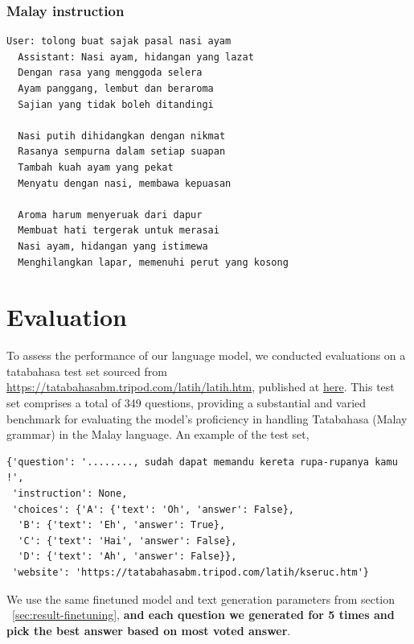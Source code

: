 \documentclass{article}
\begin{document}
\subsubsection{Malay instruction}

\begin{lstlisting}[breaklines=true]
  User: tolong buat sajak pasal nasi ayam
  Assistant: Nasi ayam, hidangan yang lazat
  Dengan rasa yang menggoda selera
  Ayam panggang, lembut dan beraroma
  Sajian yang tidak boleh ditandingi
  
  Nasi putih dihidangkan dengan nikmat
  Rasanya sempurna dalam setiap suapan
  Tambah kuah ayam yang pekat
  Menyatu dengan nasi, membawa kepuasan
  
  Aroma harum menyeruak dari dapur
  Membuat hati tergerak untuk merasai
  Nasi ayam, hidangan yang istimewa
  Menghilangkan lapar, memenuhi perut yang kosong
\end{lstlisting}

\pagebreak

\section{Evaluation}

To assess the performance of our language model, we conducted evaluations on a tatabahasa test set sourced from \url{https://tatabahasabm.tripod.com/latih/latih.htm}, published at \href{https://github.com/mesolitica/malaysian-dataset/tree/master/llm-benchmark/tatabahasabm.tripod.com}{here}. This test set comprises a total of 349 questions, providing a substantial and varied benchmark for evaluating the model's proficiency in handling Tatabahasa (Malay grammar) in the Malay language. An example of the test set,

\begin{lstlisting}[breaklines=true]
{'question': '........, sudah dapat memandu kereta rupa-rupanya kamu !',
 'instruction': None,
 'choices': {'A': {'text': 'Oh', 'answer': False},
  'B': {'text': 'Eh', 'answer': True},
  'C': {'text': 'Hai', 'answer': False},
  'D': {'text': 'Ah', 'answer': False}},
 'website': 'https://tatabahasabm.tripod.com/latih/kseruc.htm'}
\end{lstlisting}

We use the same finetuned model and text generation parameters from section ~\ref{sec:result-finetuning}, \textbf{and each question we generated for 5 times and pick the best answer based on most voted answer}.
\end{document}
